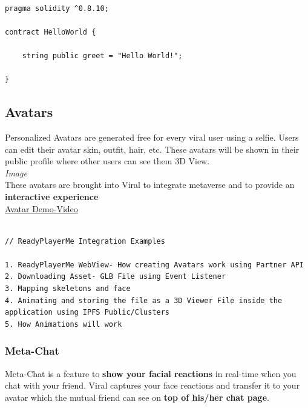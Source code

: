 \documentclass[10pt]{article}
\begin{document}
\begin{lstlisting}[language=Solidity, caption={NFT Snippet to distribute shares Just like company share where if 100 NFTs is sold, the person who holds 50 NFT will hold 50\% of the company}, numbers=none]

pragma solidity ^0.8.10;

contract HelloWorld {

    string public greet = "Hello World!";
    
}
\end{lstlisting}

\pagebreak

\subsection{Avatars}

Personalized Avatars are generated free for every viral user using a selfie. Users can edit their avatar skin, outfit, hair, etc. These avatars will be shown in their public profile where other users can see them 3D View.\\

\textit{Image}\\

These avatars are brought into Viral to integrate metaverse and to provide an \textbf{interactive experience}\\

\hyperlink{https://sample.com}{Avatar Demo-Video}\\

\begin{lstlisting}[language=Solidity]

// ReadyPlayerMe Integration Examples

1. ReadyPlayerMe WebView- How creating Avatars work using Partner API
2. Downloading Asset- GLB File using Event Listener
3. Mapping skeletons and face
4. Animating and storing the file as a 3D Viewer File inside the application using IPFS Public/Clusters
5. How Animations will work

\end{lstlisting}

\subsubsection{Meta-Chat}

Meta-Chat is a feature to \textbf{show your facial reactions} in real-time when you chat with your friend. Viral captures your face reactions and transfer it to your avatar which the mutual friend can see on \textbf{top of his/her chat page}.
\end{document}
